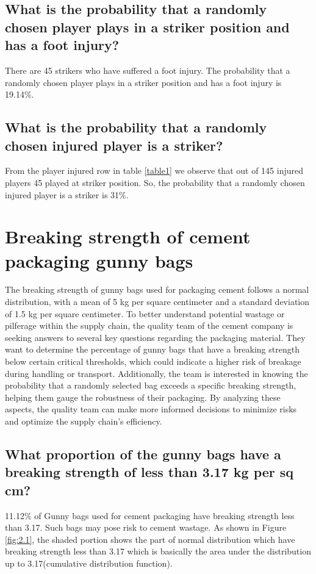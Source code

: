 \documentclass[12pt,a4paper]{style}
\begin{document}
	\subsection{What is the probability that a randomly chosen player plays in a striker position and has a foot injury?}
	There are 45 strikers who have suffered a foot injury. The probability that a randomly chosen player plays in a striker position and has a foot injury is 19.14\%.
	\subsection{What is the probability that a randomly chosen injured player is a striker?}
	From the player injured row in table \ref{table1} we observe that out of 145 injured players 45 played at striker position. So, the probability that a randomly chosen injured player is a striker is 31\%.
	
	\section{Breaking strength of cement packaging gunny bags}
The breaking strength of gunny bags used for packaging cement follows a normal distribution, with a mean of 5 kg per square centimeter and a standard deviation of 1.5 kg per square centimeter. To better understand potential wastage or pilferage within the supply chain, the quality team of the cement company is seeking answers to several key questions regarding the packaging material. They want to determine the percentage of gunny bags that have a breaking strength below certain critical thresholds, which could indicate a higher risk of breakage during handling or transport. Additionally, the team is interested in knowing the probability that a randomly selected bag exceeds a specific breaking strength, helping them gauge the robustness of their packaging. By analyzing these aspects, the quality team can make more informed decisions to minimize risks and optimize the supply chain's efficiency. 	
	\subsection{What proportion of the gunny bags have a breaking strength of less than 3.17 kg per sq cm?}
	11.12\% of Gunny bags used for cement packaging have breaking strength less than 3.17. Such bags may pose risk to cement wastage. As shown in Figure \ref{fig:2.1}, the shaded portion shows the part of normal distribution which have breaking strength less than 3.17 which is basically the area under the distribution up to 3.17(cumulative distribution function).  
\end{document}
